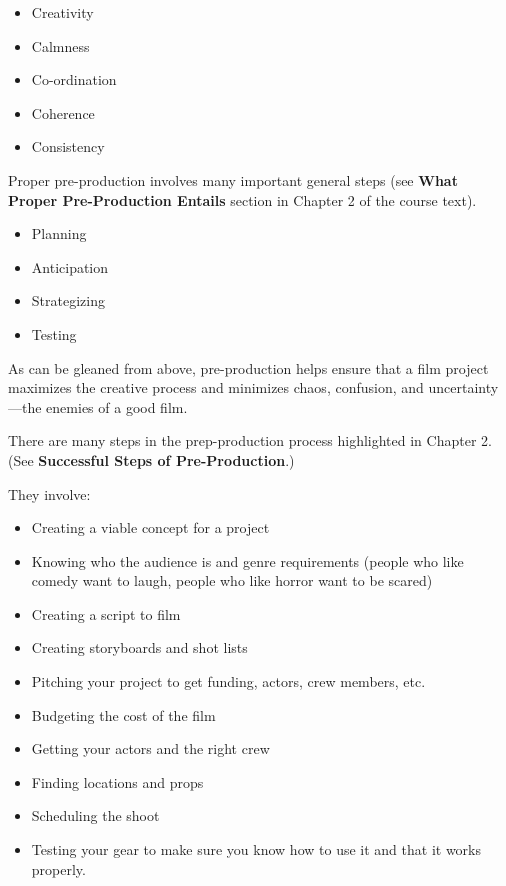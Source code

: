 \documentclass[
  letterpaper,
  DIV=11,
  numbers=noendperiod]{scrreprt}
\providecommand{\tightlist}{%
  \setlength{\itemsep}{0pt}\setlength{\parskip}{0pt}}\usepackage{longtable,booktabs,array}
\begin{document}
\begin{itemize}
\tightlist
\item
  Creativity
\item
  Calmness
\item
  Co-ordination
\item
  Coherence
\item
  Consistency
\end{itemize}

Proper pre-production involves many important general steps (see
\textbf{What Proper Pre-Production Entails} section in Chapter 2 of the
course text).

\begin{itemize}
\tightlist
\item
  Planning
\item
  Anticipation
\item
  Strategizing
\item
  Testing
\end{itemize}

As can be gleaned from above, pre-production helps ensure that a film
project maximizes the creative process and minimizes chaos, confusion,
and uncertainty---the enemies of a good film.

There are many steps in the prep-production process highlighted in
Chapter 2. (See \textbf{Successful Steps of Pre-Production}.)

They involve:

\begin{itemize}
\tightlist
\item
  Creating a viable concept for a project
\item
  Knowing who the audience is and genre requirements (people who like
  comedy want to laugh, people who like horror want to be scared)
\item
  Creating a script to film
\item
  Creating storyboards and shot lists
\item
  Pitching your project to get funding, actors, crew members, etc.
\item
  Budgeting the cost of the film
\item
  Getting your actors and the right crew
\item
  Finding locations and props
\item
  Scheduling the shoot
\item
  Testing your gear to make sure you know how to use it and that it
  works properly.
\end{itemize}
\end{document}
